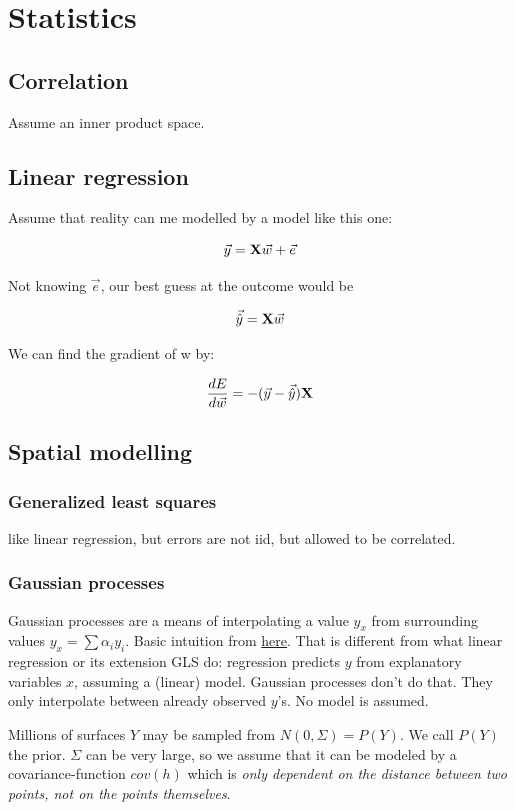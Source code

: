 \section{Statistics}

\subsection{Correlation}
Assume an inner product space.

\subsection{Linear regression}

Assume that reality can me modelled by a model like this one: 

$$ \vec{y} = \mathbf{X} \vec{w} + \vec{e} $$

Not knowing $\vec{e}$, our best guess at the outcome would be 

$$ \vec{\hat{y}} = \mathbf{X} \vec{w} $$

We can find the gradient of w by:

$$  \frac{ \mathop{dE} }{ \mathop{d\vec{w}} }  = -  (\vec{y} - \vec{\hat{y}}) \mathbf{X}  $$



\subsection{Spatial modelling}

\subsubsection{Generalized least squares}
like linear regression, but errors are not iid, but allowed to be correlated.

\subsubsection{Gaussian processes}
Gaussian processes are a means of interpolating a value $y_x$ from surrounding values $y_x = \sum \alpha_i y_i$. Basic intuition from \href{https://bookdown.org/rbg/surrogates/chap5.html}{here}.
That is different from what linear regression or its extension GLS do: regression predicts $y$ from explanatory variables $x$, assuming a (linear) model.
Gaussian processes don't do that. They only interpolate between already observed $y$'s. No model is assumed.

Millions of surfaces $Y$ may be sampled from $N(0, \Sigma) = P(Y)$.
We call $P(Y)$ the prior. $\Sigma$ can be very large, so we assume that it can be modeled by a covariance-function $cov(h)$ which is \emph{only dependent on the distance between two points, not on the points themselves}.

